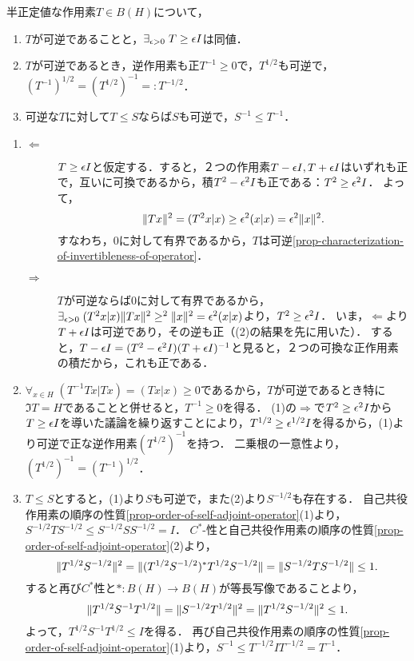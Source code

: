 \documentclass[uplatex,dvipdfmx]{jsreport}
\begin{document}
\begin{proposition}[正作用素の可逆性]
    半正定値な作用素$T\in B(H)$について，
    \begin{enumerate}
        \item $T$が可逆であることと，$\exists_{\epsilon>0}\;T\ge\epsilon I$は同値．
        \item $T$が可逆であるとき，逆作用素も正$T^{-1}\ge 0$で，$T^{1/2}$も可逆で，$(T^{-1})^{1/2}=(T^{1/2})^{-1}=:T^{-1/2}$．
        \item 可逆な$T$に対して$T\le S$ならば$S$も可逆で，$S^{-1}\le T^{-1}$．
    \end{enumerate}
\end{proposition}
\begin{Proof}\mbox{}
    \begin{enumerate}
        \item \begin{description}
            \item[$\Leftarrow$] $T\ge\epsilon I$と仮定する．すると，２つの作用素$T-\epsilon I,T+\epsilon I$はいずれも正で，互いに可換であるから，積$T^2-\epsilon^2I$も正である：$T^2\ge\epsilon^2I$．
            よって，
            \[\|Tx\|^2=(T^2x|x)\ge\epsilon^2(x|x)=\epsilon^2\|x\|^2.\]
            すなわち，$0$に対して有界であるから，$T$は可逆\ref{prop-characterization-of-invertibleness-of-operator}．
            \item[$\Rightarrow$]
            $T$が可逆ならば$0$に対して有界であるから，$\exists_{\epsilon>0}\;(T^2x|x)\|Tx\|^2\ge^2\|x\|^2=\epsilon^2(x|x)$より，$T^2\ge\epsilon^2I$．
            いま，$\Leftarrow$より$T+\epsilon I$は可逆であり，その逆も正（(2)の結果を先に用いた）．
            すると，$T-\epsilon I=(T^2-\epsilon^2I)(T+\epsilon I)^{-1}$と見ると，２つの可換な正作用素の積だから，これも正である．
        \end{description}
        \item $\forall_{x\in H}\;(T^{-1}Tx|Tx)=(Tx|x)\ge0$であるから，$T$が可逆であるとき特に$\Im T=H$であることと併せると，$T^{-1}\ge0$を得る．
        (1)の$\Rightarrow$で$T^2\ge\epsilon^2I$から$T\ge\epsilon I$を導いた議論を繰り返すことにより，$T^{1/2}\ge\epsilon^{1/2}I$を得るから，(1)より可逆で正な逆作用素$(T^{1/2})^{-1}$を持つ．
        二乗根の一意性より，$(T^{1/2})^{-1}=(T^{-1})^{1/2}$．
        \item $T\le S$とすると，(1)より$S$も可逆で，また(2)より$S^{-1/2}$も存在する．
        自己共役作用素の順序の性質\ref{prop-order-of-self-adjoint-operator}(1)より，$S^{-1/2}TS^{-1/2}\le S^{-1/2}SS^{-1/2}=I$．
        $C^*$-性と自己共役作用素の順序の性質\ref{prop-order-of-self-adjoint-operator}(2)より，
        \[\|T^{1/2}S^{-1/2}\|^2=\|(T^{1/2}S^{-1/2})^*T^{1/2}S^{-1/2}\|=\|S^{-1/2}TS^{-1/2}\|\le 1.\]
        すると再び$C^*$性と$*:B(H)\to B(H)$が等長写像であることより，
        \[\|T^{1/2}S^{-1}T^{1/2}\|=\|S^{-1/2}T^{1/2}\|^2=\|T^{1/2}S^{-1/2}\|^2\le1.\]
        よって，$T^{1/2}S^{-1}T^{1/2}\le I$を得る．
        再び自己共役作用素の順序の性質\ref{prop-order-of-self-adjoint-operator}(1)より，$S^{-1}\le T^{-1/2}IT^{-1/2}=T^{-1}$．
    \end{enumerate}
\end{Proof}
\end{document}

